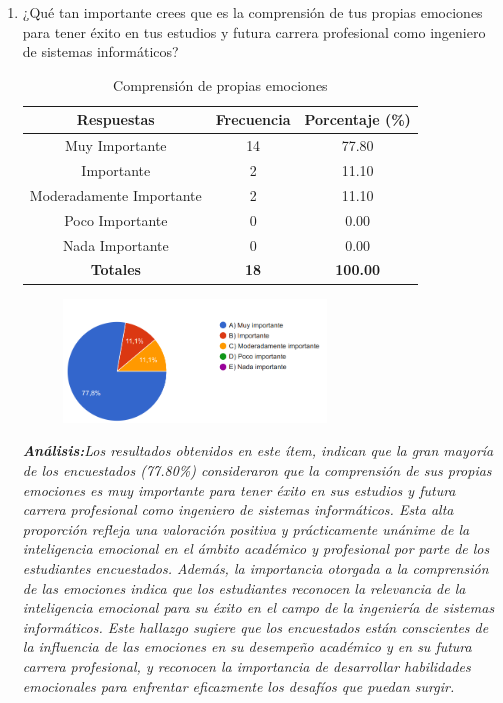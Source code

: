 \documentclass[journal]{IEEEtran}
\begin{document}
\begin{enumerate}
\item ¿Qué tan importante crees que es la comprensión de tus propias emociones para tener éxito en tus estudios y futura carrera profesional como ingeniero de sistemas informáticos?
	\begin{table}[H]
		\renewcommand{\arraystretch}{1.3}
		\centering
		\caption{Comprensión de propias emociones}
		\begin{tabular}{c c c}
			\hline
			\textbf{Respuestas} & \textbf{Frecuencia} & \textbf{Porcentaje (\%)}\\
			\hline
			Muy Importante & 14 & 77.80 \\
			Importante & 2 & 11.10 \\
			Moderadamente Importante & 2 & 11.10\\
			Poco Importante & 0 & 0.00\\
			Nada Importante & 0 & 0.00\\
			\hline
			\textbf{Totales} &\textbf{18}& \textbf{100.00}\\
			\hline
		\end{tabular}
	\end{table}
	\begin{figure}[h]
		\centering
		\includegraphics[width=07cm]{Pregunta 2}
	\end{figure}
	\textit{\textbf{Análisis:}Los resultados obtenidos en este ítem, indican que la gran mayoría de los encuestados (77.80\%) consideraron que la comprensión de sus propias emociones es muy importante para tener éxito en sus estudios y futura carrera profesional como ingeniero de sistemas informáticos. Esta alta proporción refleja una valoración positiva y prácticamente unánime de la inteligencia emocional en el ámbito académico y profesional por parte de los estudiantes encuestados.
Además, la importancia otorgada a la comprensión de las emociones indica que los estudiantes reconocen la relevancia de la inteligencia emocional para su éxito en el campo de la ingeniería de sistemas informáticos. Este hallazgo sugiere que los encuestados están conscientes de la influencia de las emociones en su desempeño académico y en su futura carrera profesional, y reconocen la importancia de desarrollar habilidades emocionales para enfrentar eficazmente los desafíos que puedan surgir.
}\\


\end{enumerate}
\end{document}
